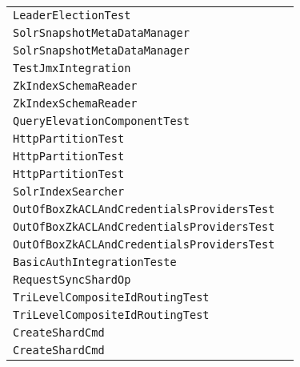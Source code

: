 \begin{center}
\begin{tabular}{ll}
\lstinline/LeaderElectionTest/&\raisebox{0pt}{\lstinline/ParallelElection()/}\\
\lstinline/SolrSnapshotMetaDataManager/&\raisebox{0pt}{\lstinline/release(String)/}\\
\lstinline/SolrSnapshotMetaDataManager/&\raisebox{0pt}{\lstinline/release(String)/}\\
\lstinline/TestJmxIntegration/&\raisebox{0pt}{\lstinline/JmxUpdate()/}\\
\lstinline/ZkIndexSchemaReader/&\raisebox{0pt}{\lstinline/command()/}\\
\lstinline/ZkIndexSchemaReader/&\raisebox{0pt}{\lstinline/command()/}\\
\lstinline/QueryElevationComponentTest/&\raisebox{0pt}{\lstinline/writeFile(File)/}\\
\lstinline/HttpPartitionTest/&\raisebox{0pt}{\lstinline/waitToSeeReplicasActive(String)/}\\
\lstinline/HttpPartitionTest/&\raisebox{0pt}{\lstinline/waitToSeeReplicasActive(String)/}\\
\lstinline/HttpPartitionTest/&\raisebox{0pt}{\lstinline/waitToSeeReplicasActive(String)/}\\
\lstinline/SolrIndexSearcher/&\raisebox{0pt}{\lstinline/getStoredHighlightFieldNames()/}\\
\lstinline/OutOfBoxZkACLAndCredentialsProvidersTest/&\raisebox{0pt}{\lstinline/assertOpenACLUnsafeAllover()/}\\
\lstinline/OutOfBoxZkACLAndCredentialsProvidersTest/&\raisebox{0pt}{\lstinline/assertOpenACLUnsafeAllover()/}\\
\lstinline/OutOfBoxZkACLAndCredentialsProvidersTest/&\raisebox{0pt}{\lstinline/assertOpenACLUnsafeAllover()/}\\
\lstinline/BasicAuthIntegrationTeste/&\raisebox{0pt}{\lstinline/setBasicAuthHeader(String)/}\\
\lstinline/RequestSyncShardOp/&\raisebox{0pt}{\lstinline/execute(CallInfoit)/}\\
\lstinline/TriLevelCompositeIdRoutingTest/&\raisebox{0pt}{\lstinline/doTriLevelHashingTestWithBitMask()/}\\
\lstinline/TriLevelCompositeIdRoutingTest/&\raisebox{0pt}{\lstinline/doTriLevelHashingTestWithBitMask()/}\\
\lstinline/CreateShardCmd/&\raisebox{0pt}{\lstinline/call(ClusterState)/}\\
\lstinline/CreateShardCmd/&\raisebox{0pt}{\lstinline/call(ClusterState)/}\\

\end{tabular}
\end{center}
